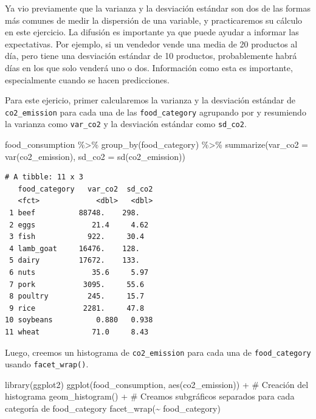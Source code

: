 \documentclass[
  letterpaper,
  DIV=11,
  numbers=noendperiod]{scrreprt}
\newenvironment{Shaded}{\begin{snugshade}}{\end{snugshade}}
\newcommand{\AttributeTok}[1]{\textcolor[rgb]{0.40,0.45,0.13}{#1}}
\newcommand{\CommentTok}[1]{\textcolor[rgb]{0.37,0.37,0.37}{#1}}
\newcommand{\FunctionTok}[1]{\textcolor[rgb]{0.28,0.35,0.67}{#1}}
\newcommand{\NormalTok}[1]{\textcolor[rgb]{0.00,0.23,0.31}{#1}}
\newcommand{\SpecialCharTok}[1]{\textcolor[rgb]{0.37,0.37,0.37}{#1}}
\begin{document}
Ya vio previamente que la varianza y la desviación estándar son dos de
las formas más comunes de medir la dispersión de una variable, y
practicaremos su cálculo en este ejercicio. La difusión es importante ya
que puede ayudar a informar las expectativas. Por ejemplo, si un
vendedor vende una media de 20 productos al día, pero tiene una
desviación estándar de 10 productos, probablemente habrá días en los que
solo venderá uno o dos. Información como esta es importante,
especialmente cuando se hacen predicciones.

Para este ejericio, primer calcularemos la varianza y la desviación
estándar de \texttt{co2\_emission} para cada una de las
\texttt{food\_category} agrupando por y resumiendo la varianza como
\texttt{var\_co2} y la desviación estándar como \texttt{sd\_co2}.

\begin{Shaded}
\begin{Highlighting}[]
\NormalTok{food\_consumption }\SpecialCharTok{\%\textgreater{}\%} 
  \FunctionTok{group\_by}\NormalTok{(food\_category) }\SpecialCharTok{\%\textgreater{}\%} 
  \FunctionTok{summarize}\NormalTok{(}\AttributeTok{var\_co2 =} \FunctionTok{var}\NormalTok{(co2\_emission),}
           \AttributeTok{sd\_co2 =} \FunctionTok{sd}\NormalTok{(co2\_emission))}
\end{Highlighting}
\end{Shaded}

\begin{verbatim}
# A tibble: 11 x 3
   food_category   var_co2  sd_co2
   <fct>             <dbl>   <dbl>
 1 beef          88748.    298.   
 2 eggs             21.4     4.62 
 3 fish            922.     30.4  
 4 lamb_goat     16476.    128.   
 5 dairy         17672.    133.   
 6 nuts             35.6     5.97 
 7 pork           3095.     55.6  
 8 poultry         245.     15.7  
 9 rice           2281.     47.8  
10 soybeans          0.880   0.938
11 wheat            71.0     8.43 
\end{verbatim}

Luego, creemos un histograma de \texttt{co2\_emission} para cada una de
\texttt{food\_category} usando \texttt{facet\_wrap()}.

\begin{Shaded}
\begin{Highlighting}[]
\FunctionTok{library}\NormalTok{(ggplot2)}
\FunctionTok{ggplot}\NormalTok{(food\_consumption, }\FunctionTok{aes}\NormalTok{(co2\_emission)) }\SpecialCharTok{+}
  \CommentTok{\# Creación del  histograma}
  \FunctionTok{geom\_histogram}\NormalTok{() }\SpecialCharTok{+}
  \CommentTok{\# Creamos subgráficos separados para cada categoría de food\_category}
  \FunctionTok{facet\_wrap}\NormalTok{(}\SpecialCharTok{\textasciitilde{}}\NormalTok{ food\_category)}
\end{Highlighting}
\end{Shaded}
\end{document}
